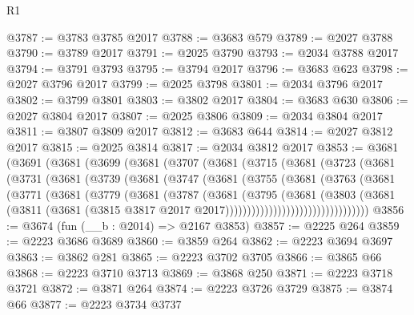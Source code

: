 \begin{lexlean}{R1}
\begin{coremodule}
@3787 := @3783 @3785 @2017
@3788 := @3683 @579
@3789 := @2027 @3788
@3790 := @3789 @2017
@3791 := @2025 @3790
@3793 := @2034 @3788 @2017
@3794 := @3791 @3793
@3795 := @3794 @2017
@3796 := @3683 @623
@3798 := @2027 @3796 @2017
@3799 := @2025 @3798
@3801 := @2034 @3796 @2017
@3802 := @3799 @3801
@3803 := @3802 @2017
@3804 := @3683 @630
@3806 := @2027 @3804 @2017
@3807 := @2025 @3806
@3809 := @2034 @3804 @2017
@3811 := @3807 @3809 @2017
@3812 := @3683 @644
@3814 := @2027 @3812 @2017
@3815 := @2025 @3814
@3817 := @2034 @3812 @2017
@3853 := @3681
    (@3691
      (@3681
        (@3699
          (@3681
            (@3707
              (@3681
                (@3715
                  (@3681
                    (@3723
                      (@3681
                        (@3731
                          (@3681
                            (@3739
                              (@3681
                                (@3747
                                  (@3681
                                    (@3755
                                      (@3681
                                        (@3763
                                          (@3681
                                            (@3771
                                              (@3681
                                                (@3779
                                                  (@3681
                                                    (@3787
                                                      (@3681
                                                        (@3795
                                                          (@3681
                                                            (@3803
                                                              (@3681
                                                                (@3811
                                                                  (@3681
                                                                    (@3815
                                                                      @3817
                                                                      @2017
                                                                      @2017)))))))))))))))))))))))))))))))))
@3856 := @3674 (fun (__b : @2014) => @2167 @3853)
@3857 := @2225 @264
@3859 := @2223 @3686 @3689
@3860 := @3859 @264
@3862 := @2223 @3694 @3697
@3863 := @3862 @281
@3865 := @2223 @3702 @3705
@3866 := @3865 @66
@3868 := @2223 @3710 @3713
@3869 := @3868 @250
@3871 := @2223 @3718 @3721
@3872 := @3871 @264
@3874 := @2223 @3726 @3729
@3875 := @3874 @66
@3877 := @2223 @3734 @3737

\end{coremodule}
\end{lexlean}
